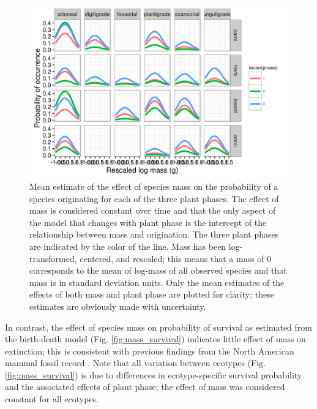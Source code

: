 \documentclass[12pt,letterpaper]{article}
\begin{document}
\begin{figure}[ht]
  \centering
  \includegraphics[width=\textwidth,height=0.5\textheight,keepaspectratio=true]{figure/mass_on_origin_bd}
  \caption[Effect of mass on probability of species origination as estimated from the birth-death model]{Mean estimate of the effect of species mass on the probability of a species originating for each of the three plant phases. The effect of mass is considered constant over time and that the only aspect of the model that changes with plant phase is the intercept of the relationship between mass and origination. The three plant phases are indicated by the color of the line. Mass has been log-transformed, centered, and rescaled; this means that a mass of 0 corresponds to the mean of log-mass of all observed species and that mass is in standard deviation units. Only the mean estimates of the effects of both mass and plant phase are plotted for clarity; these estimates are obviously made with uncertainty.}
  \label{fig:mass_origin}
\end{figure}



In contrast, the effect of species mass on probability of survival as estimated from the birth-death model (Fig. \ref{fig:mass_survival}) indicates little effect of mass on extinction; this is consistent with previous findings from the North American mammal fossil record \citep{Smits2015b,Tomiya2013}. Note that all variation between ecotypes (Fig. \ref{fig:mass_survival}) is due to differences in ecotype-specific survival probability and the associated effects of plant phase; the effect of mass was considered constant for all ecotypes.
\end{document}

